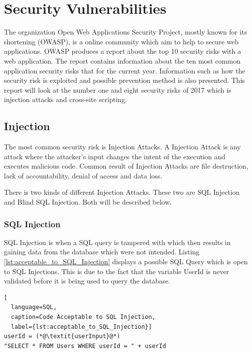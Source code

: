 \section{Security Vulnerabilities}
The organization Open Web Applications Security Project, mostly known for its shortening (OWASP), is a online community which aim to help to secure web applications. \parencite{OpenWebApplicationSecurityProject} OWASP produces a report about the top 10 security risks with a web application. The report contains information about the ten most common application security risks that for the current year. Information such as how the security risk is exploited and possible prevention method is also presented. \parencite{OWASP2017} This report will look at the number one and eight security risks of 2017 which is injection attacks and cross-site scripting. \parencite{OWASP2017}


\subsection{Injection}
The most common security risk is Injection Attacks. \parencite{OWASP2017} A Injection Attack is any attack where the attacker's input changes the intent of the execution and executes malicious code. Common result of Injection Attacks are file destruction, lack of accountability, denial of access and data loss. \parencite{Secure_Web}

There is two kinds of different Injection Attacks. These two are SQL Injection and Blind SQL Injection. \parencite{Secure_Web} Both will be described below.


\subsubsection{SQL Injection}
SQL Injection is when a SQL query is tampered with which then results in gaining data from the database which were not intended. Listing \ref{lst:acceptable_to_SQL_Injection} displays a possible SQL Query which is open to SQL Injections. This is due to the fact that the variable UserId is never validated before it is being used to query the database. \parencite{JustinClarke-Salt2009SIAa, Secure_Web} 

\hfill
\begin{lstlisting}[
  language=SQL,
  caption=Code Acceptable to SQL Injection,
  label={lst:acceptable_to_SQL_Injection}]
userId = (*@\textit{userInput}@*)
"SELECT * FROM Users WHERE userId = " + userId
\end{lstlisting}
\hfill

